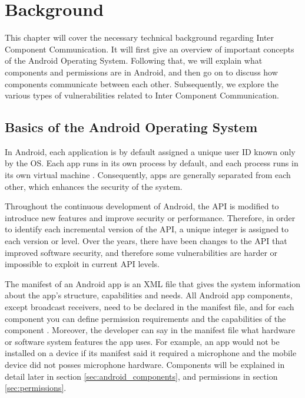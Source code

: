 \chapter{Background}
    \label{chap:background}

   This chapter will cover the necessary technical background regarding Inter Component Communication. It will first give an overview of important concepts of the Android Operating System. Following that, we will explain what components and permissions are in Android, and then go on to discuss how components communicate between each other. Subsequently, we explore the various types of vulnerabilities related to Inter Component Communication. 
    
    \section{Basics of the Android Operating System}
        \label{sec:android_basics}
    
    In Android, each application is by default assigned a unique user ID known only by the OS. Each app runs in its own process by default, and each process runs in its own virtual machine \cite{android_app_fundamentals}. Consequently, apps are generally separated from each other, which enhances the security of the system.
    
    Throughout the continuous development of Android, the API is modified to introduce new features and improve security or performance. Therefore, in order to identify each incremental version of the API, a unique integer is assigned to each version or level. Over the years, there have been changes to the API that improved software security, and therefore some vulnerabilities are harder or impossible to exploit in current API levels.
    
    The manifest of an Android app is an XML file that gives the system information about the app’s structure, capabilities and needs. All Android app components, except broadcast receivers, need to be declared in the manifest file, and for each component you can define permission requirements and the capabilities of the component \cite{android_app_fundamentals}. Moreover, the developer can say in the manifest file what hardware or software system features the app uses. For example, an app would not be installed on a device if its manifest said it required a microphone and the mobile device did not posses microphone hardware.  Components will be explained in detail later in section \ref{sec:android_components}, and permissions in section \ref{sec:permissions}.
    
